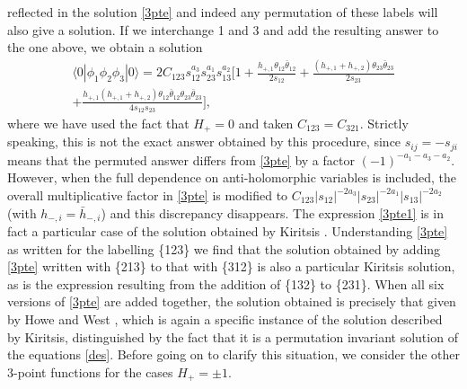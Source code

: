 \documentclass[a4paper,12pt]{article}
\def\thetabar    {\bar{\theta}}
\begin{document}
reflected in the solution \eqref{3pte} and indeed any permutation of
these labels will also give a solution.  If we interchange 1 and 3 and add
the resulting answer to the one above, we obtain a solution
\begin{multline}
\label{3pte1}
\langle 0 | \phi_1 \phi_2 \phi_3 | 0 \rangle =
2 C_{123} s_{12}^{a_3} s_{23}^{a_1} s_{13}^{a_2} \bigg[ 1 +
\frac{h_{+,1} \theta_{12}\thetabar_{12}}{2s_{12}}
 + \frac{(h_{+,1}+h_{+,2})
\theta_{23}\thetabar_{23}}{2s_{23}}\\
 + \frac{h_{+,1}(h_{+,1}+h_{+,2})
\theta_{12}\thetabar_{12}\theta_{23}\thetabar_{23}}{4s_{12}s_{23}}\bigg],  
\end{multline}
where we have used the fact that $H_+=0$ and taken $C_{123}=C_{321}$.
Strictly speaking, this is  not the exact answer obtained by this
procedure, since $s_{ij}=-s_{ji}$ means that the permuted answer differs from
\eqref{3pte} by a factor $(-1)^{-a_1-a_3-a_2}$.  However, when the
full dependence on anti-holomorphic variables is included, the overall
multiplicative factor in \eqref{3pte} is modified to
$C_{123}|s_{12}|^{-2a_3}|s_{23}|^{-2a_1}|s_{13}|^{-2a_2}$ (with
$h_{-,i}=\bar{h}_{-,i}$) and this discrepancy disappears.  The expression
\eqref{3pte1} is in fact a particular case of the solution obtained by
Kiritsis \cite{Kir}.  Understanding \eqref{3pte} as written for the
labelling \{123\} we find that the solution obtained by adding
\eqref{3pte} written with \{213\} to that with \{312\} is also a particular
Kiritsis solution, as is the expression resulting from the addition of
\{132\} to \{231\}.  When all six versions of \eqref{3pte} are added
together, the solution obtained is precisely that given by Howe and West
\cite{West}, which is again a specific instance of the solution
described by Kiritsis, distinguished by the fact that it is a
permutation invariant solution of the equations \eqref{des}.  Before
going on to clarify this situation, we consider the other 3-point
functions for the cases $H_+=\pm 1$.
\end{document}
